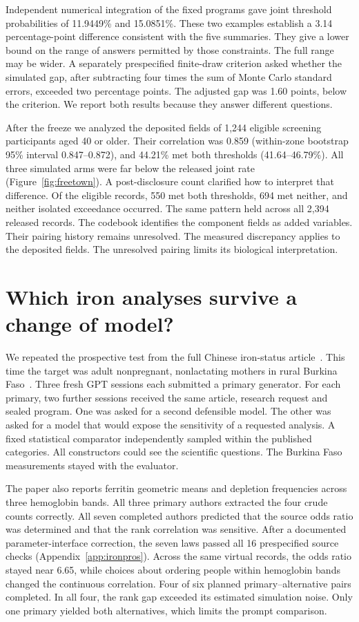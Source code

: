 \documentclass[sigconf,anonymous,review]{acmart}
\begin{document}
Independent numerical integration of the fixed programs gave joint threshold probabilities of 11.9449\% and 15.0851\%. These two examples establish a 3.14 percentage-point difference consistent with the five summaries. They give a lower bound on the range of answers permitted by those constraints. The full range may be wider. A separately prespecified finite-draw criterion asked whether the simulated gap, after subtracting four times the sum of Monte Carlo standard errors, exceeded two percentage points. The adjusted gap was 1.60 points, below the criterion. We report both results because they answer different questions.

After the freeze we analyzed the deposited fields of 1,244 eligible screening participants aged 40 or older. Their correlation was 0.859 (within-zone bootstrap 95\% interval 0.847--0.872), and 44.21\% met both thresholds (41.64--46.79\%). All three simulated arms were far below the released joint rate (Figure~\ref{fig:freetown}). A post-disclosure count clarified how to interpret that difference. Of the eligible records, 550 met both thresholds, 694 met neither, and neither isolated exceedance occurred. The same pattern held across all 2,394 released records. The codebook identifies the component fields as added variables. Their pairing history remains unresolved. The measured discrepancy applies to the deposited fields. The unresolved pairing limits its biological interpretation.


\section{Which iron analyses survive a change of model?}
\label{sec:ironpros}
We repeated the prospective test from the full Chinese iron-status article~\cite{zhu}. This time the target was adult nonpregnant, nonlactating mothers in rural Burkina Faso~\cite{burkina_iron}. Three fresh GPT sessions each submitted a primary generator. For each primary, two further sessions received the same article, research request and sealed program. One was asked for a second defensible model. The other was asked for a model that would expose the sensitivity of a requested analysis. A fixed statistical comparator independently sampled within the published categories. All constructors could see the scientific questions. The Burkina Faso measurements stayed with the evaluator.

The paper also reports ferritin geometric means and depletion frequencies across three hemoglobin bands. All three primary authors extracted the four crude counts correctly. All seven completed authors predicted that the source odds ratio was determined and that the rank correlation was sensitive. After a documented parameter-interface correction, the seven laws passed all 16 prespecified source checks (Appendix~\ref{app:ironpros}). Across the same virtual records, the odds ratio stayed near 6.65, while choices about ordering people within hemoglobin bands changed the continuous correlation. Four of six planned primary--alternative pairs completed. In all four, the rank gap exceeded its estimated simulation noise. Only one primary yielded both alternatives, which limits the prompt comparison.
\end{document}
